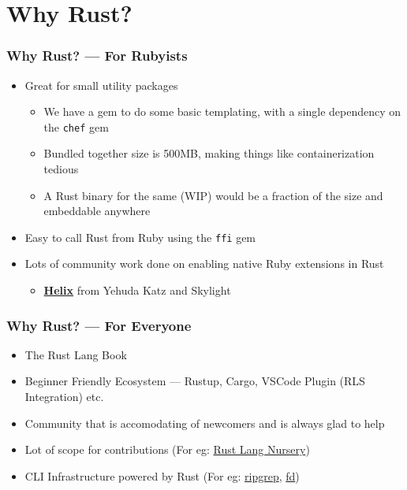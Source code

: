\section{Why Rust?}
\label{sec:why-rust}


\begin{frame}[fragile]
  \frametitle{Why Rust? --- For Rubyists}
  \begin{itemize}
  \item Great for small utility packages
    \begin{itemize}
    \item We have a gem to do some basic templating, with a single dependency on the {\footnotesize \texttt{chef}} gem
    \item Bundled together size is 500MB, making things like containerization tedious
    \item A Rust binary for the same (WIP) would be a fraction of the size and embeddable anywhere
    \end{itemize}
  \item Easy to call Rust from Ruby using the {\footnotesize \texttt{ffi}} gem
  \item Lots of community work done on enabling native Ruby extensions in Rust
    \begin{itemize}
    \item \href{https://usehelix.com/}{\textbf{Helix}} from Yehuda Katz and Skylight
    \end{itemize}
  \end{itemize}
\end{frame}

\begin{frame}
  \frametitle{Why Rust? --- For Everyone}
  \begin{itemize}
  \item The Rust Lang Book \cite{RustLangEd}
  \item Beginner Friendly Ecosystem --- Rustup, Cargo, VSCode Plugin (RLS Integration) etc.
  \item Community that is accomodating of newcomers and is always glad to help
  \item Lot of scope for contributions (For eg: \href{https://github.com/rust-lang-nursery/}{Rust Lang Nursery})
  \item CLI Infrastructure powered by Rust (For eg: \href{https://github.com/BurntSushi/riggrep/}{ripgrep}, \href{https://github.com/sharkdp/fd/}{fd})
  \end{itemize}
\end{frame}
